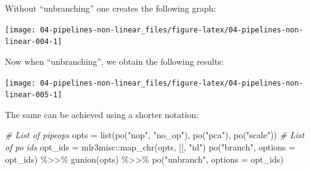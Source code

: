 \documentclass[
]{scrbook}
\newenvironment{Shaded}{\begin{snugshade}}{\end{snugshade}}
\newcommand{\AttributeTok}[1]{\textcolor[rgb]{0.77,0.63,0.00}{#1}}
\newcommand{\CommentTok}[1]{\textcolor[rgb]{0.56,0.35,0.01}{\textit{#1}}}
\newcommand{\ConstantTok}[1]{\textcolor[rgb]{0.00,0.00,0.00}{#1}}
\newcommand{\FunctionTok}[1]{\textcolor[rgb]{0.00,0.00,0.00}{#1}}
\newcommand{\NormalTok}[1]{#1}
\newcommand{\OtherTok}[1]{\textcolor[rgb]{0.56,0.35,0.01}{#1}}
\newcommand{\SpecialCharTok}[1]{\textcolor[rgb]{0.00,0.00,0.00}{#1}}
\newcommand{\StringTok}[1]{\textcolor[rgb]{0.31,0.60,0.02}{#1}}
\renewenvironment{Shaded} {\begin{snugshade}\small} {\end{snugshade}}
\begin{document}
Without ``unbranching'' one creates the following graph:

\begin{Shaded}
\end{Shaded}

\begin{center}\texttt{[image: 04-pipelines-non-linear\_files/figure-latex/04-pipelines-non-linear-004-1]} \end{center}

Now when ``unbranching'', we obtain the following results:

\begin{Shaded}
\end{Shaded}

\begin{center}\texttt{[image: 04-pipelines-non-linear\_files/figure-latex/04-pipelines-non-linear-005-1]} \end{center}

The same can be achieved using a shorter notation:

\begin{Shaded}
\begin{Highlighting}[]
\CommentTok{\# List of pipeops}
\NormalTok{opts }\OtherTok{=} \FunctionTok{list}\NormalTok{(}\FunctionTok{po}\NormalTok{(}\StringTok{"nop"}\NormalTok{, }\StringTok{"no\_op"}\NormalTok{), }\FunctionTok{po}\NormalTok{(}\StringTok{"pca"}\NormalTok{), }\FunctionTok{po}\NormalTok{(}\StringTok{"scale"}\NormalTok{))}
\CommentTok{\# List of po ids}
\NormalTok{opt\_ids }\OtherTok{=}\NormalTok{ mlr3misc}\SpecialCharTok{::}\FunctionTok{map\_chr}\NormalTok{(opts, }\StringTok{\textasciigrave{}}\AttributeTok{[[}\StringTok{\textasciigrave{}}\NormalTok{, }\StringTok{"id"}\NormalTok{)}
\FunctionTok{po}\NormalTok{(}\StringTok{"branch"}\NormalTok{, }\AttributeTok{options =}\NormalTok{ opt\_ids) }\SpecialCharTok{\%\textgreater{}\textgreater{}\%}
  \FunctionTok{gunion}\NormalTok{(opts) }\SpecialCharTok{\%\textgreater{}\textgreater{}\%}
  \FunctionTok{po}\NormalTok{(}\StringTok{"unbranch"}\NormalTok{, }\AttributeTok{options =}\NormalTok{ opt\_ids)}
\end{Highlighting}
\end{Shaded}
\end{document}
